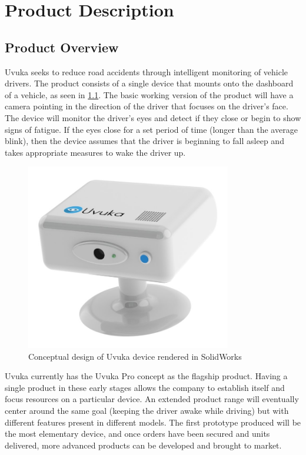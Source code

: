\newpage 
\chapter{Product Description}
\section{Product Overview}
Uvuka seeks to reduce road accidents through intelligent monitoring of vehicle drivers. The product consists of a single device that mounts onto the dashboard of a vehicle, as seen in \cref{fig:Uvuka_casing_concept}. The basic working version of the product will have a camera pointing in the direction of the driver that focuses on the driver's face. The device will monitor the driver's eyes and detect if they close or begin to show signs of fatigue. If the eyes close for a set period of time (longer than the average blink), then the device assumes that the driver is beginning to fall asleep and takes appropriate measures to wake the driver up.

\begin{figure}[H]
\centering
\includegraphics[width=0.8\textwidth]{images/Uvuka_casing_concept.JPG}
\vskip10pt
\caption{Conceptual design of Uvuka device rendered in SolidWorks}
\label{fig:Uvuka_casing_concept}
\end{figure}

Uvuka currently has the Uvuka Pro concept as the flagship product. Having a single product in these early stages allows the company to establish itself and focus resources on a particular device. An extended product range will eventually center around the same goal (keeping the driver awake while driving) but with different features present in different models. The first prototype produced will be the most elementary device, and once orders have been secured and units delivered, more advanced products can be developed and brought to market.

